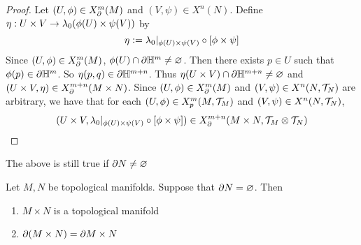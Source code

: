 \documentclass{book}
\begin{document}
\begin{proof}
	Let $(U, \phi) \in X^m_{\partial}(M)$ and $(V, \psi) \in X^n(N)$. Define $\eta: U \times V \rightarrow \lambda_0(\phi(U) \times \psi(V))$ by 
	$$\eta \vcentcolon= \lambda_0|_{\phi(U) \times \psi(V)} \circ [\phi \times \psi]$$ 
	Since $(U, \phi) \in X^m_{\partial}(M)$, $\phi(U) \cap \partial \mathbb{H}^m \neq \varnothing$. Then there exists $p \in U$ such that $\phi(p) \in \partial \mathbb{H}^m$. So $\eta(p,q) \in \partial \mathbb{H}^{m+n}$. Thus $\eta(U \times V) \cap \partial \mathbb{H}^{m+n} \neq \varnothing$ and $(U \times V, \eta) \in X^{m+n}_{\partial}(M \times N)$. Since $(U, \phi) \in X^m_{\partial}(M)$ and $(V, \psi) \in X^n(N, \mathcal{T}_N)$ are arbitrary, we have that for each $(U, \phi) \in X^m_p(M, \mathcal{T}_M)$ and $(V, \psi) \in X^n(N, \mathcal{T}_N)$, 
	$$(U \times V, \lambda_0|_{\phi(U) \times \psi(V)} \circ [\phi \times \psi]) \in X^{m+n}_{\partial}(M \times N,  \mathcal{T}_M \otimes \mathcal{T}_N)$$ 
\end{proof}

\begin{note}
	The above is still true if $\partial N \neq \varnothing$
\end{note}

\begin{ex} 
	Let $M,N$ be topological manifolds. Suppose that $\partial N = \varnothing$. Then 
	\begin{enumerate}
		\item $M \times N$ is a topological manifold
		\item $\partial(M \times N) = \partial M \times N$
	\end{enumerate}
\end{ex}
\end{document}
